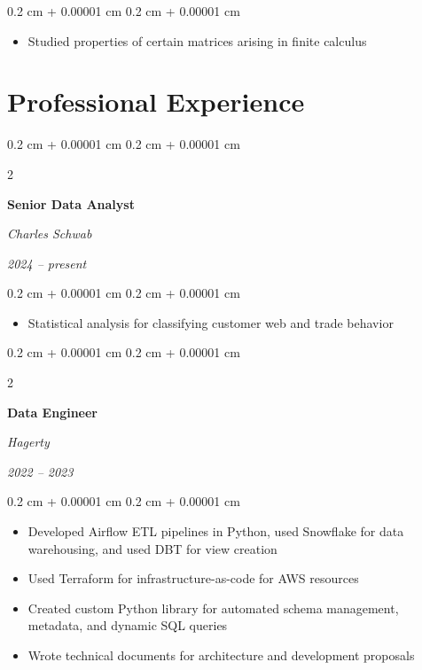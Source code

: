 \documentclass[10pt, letterpaper]{article}
\newenvironment{highlights}{
    \begin{itemize}[
        topsep=0.10 cm,
        parsep=0.10 cm,
        partopsep=0pt,
        itemsep=0pt,
        leftmargin=0.4 cm + 10pt
    ]
}{
    \end{itemize}
} %
\newenvironment{onecolentry}{
    \begin{adjustwidth}{
        0.2 cm + 0.00001 cm
    }{
        0.2 cm + 0.00001 cm
    }
}{
    \end{adjustwidth}
} %
\newenvironment{twocolentry}[2][]{
    \onecolentry
    \def\secondColumn{#2}
    \setcolumnwidth{\fill, 4.5 cm}
    \begin{paracol}{2}
}{
    \switchcolumn \raggedleft \secondColumn
    \end{paracol}
    \endonecolentry
} %
\begin{document}
        \vspace{0.10 cm}
        \begin{onecolentry}
            \begin{highlights}
                \item Studied properties of certain matrices arising in finite calculus
            \end{highlights}
        \end{onecolentry}



    
    \section{Professional Experience}



        
        \begin{twocolentry}{
            
            
        \textit{2024 – present}}
            \textbf{Senior Data Analyst}
            
            \textit{Charles Schwab}
        \end{twocolentry}

        \vspace{0.10 cm}
        \begin{onecolentry}
            \begin{highlights}
                \item Statistical analysis for classifying customer web and trade behavior
            \end{highlights}
        \end{onecolentry}


        \vspace{0.2 cm}

        \begin{twocolentry}{
            
            
        \textit{2022 – 2023}}
            \textbf{Data Engineer}
            
            \textit{Hagerty}
        \end{twocolentry}

        \vspace{0.10 cm}
        \begin{onecolentry}
            \begin{highlights}
                \item Developed Airflow ETL pipelines in Python, used Snowflake for data warehousing, and used DBT for view creation
                \item Used Terraform for infrastructure-as-code for AWS resources
                \item Created custom Python library for automated schema management, metadata, and dynamic SQL queries
                \item Wrote technical documents for architecture and development proposals
            \end{highlights}
        \end{onecolentry}
\end{document}
